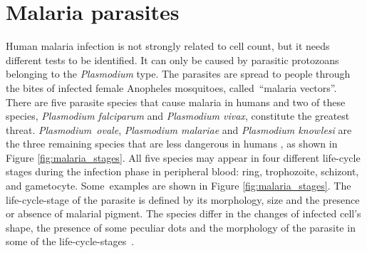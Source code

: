 \section{Malaria parasites}
Human malaria infection is not strongly related to cell count, but it needs different tests to be identified. It can only be caused by parasitic protozoans belonging to the \emph{Plasmodium} type. The parasites are spread to people through the bites of infected female Anopheles mosquitoes, called~``malaria vectors''.
There are five parasite species that cause malaria in humans and two of these species, \emph{Plasmodium falciparum} and \emph{Plasmodium vivax}, constitute the greatest threat. \emph{Plasmodium~ovale}, \emph{Plasmodium malariae} and \emph{Plasmodium knowlesi} are the three remaining species that are less dangerous in humans \cite{WHO_dec_2016}, as shown in Figure \ref{fig:malaria_stages}.
All five species may appear in four different life-cycle stages during the infection phase in peripheral blood: ring, trophozoite, schizont, and gametocyte. Some~examples are shown in Figure \ref{fig:malaria_stages}.
The life-cycle-stage of the parasite is defined by its morphology, size and the presence or absence of malarial pigment.
The species differ in the changes of infected cell's shape, the presence of some peculiar dots and the morphology of the parasite in some of the life-cycle-stages~\cite{Somasekar2011}.
